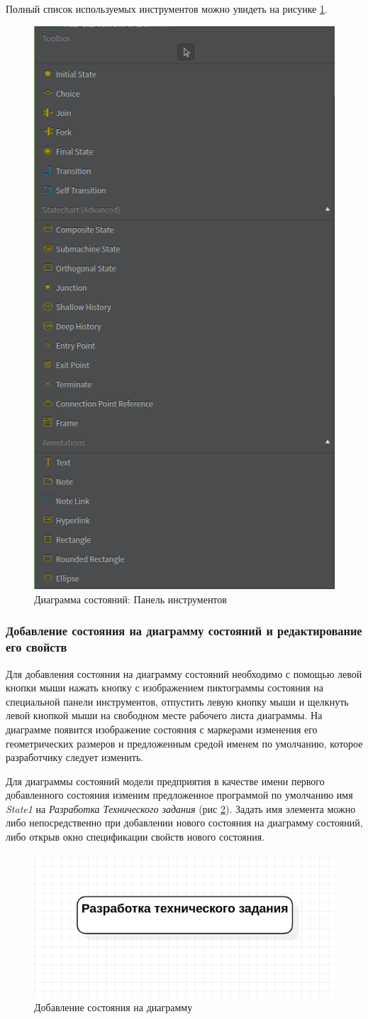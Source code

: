 \documentclass[a4paper,12pt]{report}
\begin{document}
Полный список используемых инструментов можно увидеть на рисунке \ref{fig:statecharttoolbox}.
\newpage
\begin{figure}[h!]
	\centering
	\includegraphics[width=0.4\linewidth]{images/statecharttoolbox}
	\caption{Диаграмма состояний: Панель инструментов}
	\label{fig:statecharttoolbox}
\end{figure}
\subsubsection*{Добавление состояния на диаграмму состояний и редактирование его свойств}
Для добавления состояния на диаграмму состояний необходимо с помощью левой кнопки мыши нажать кнопку с изображением пиктограммы состояния на специальной панели инструментов, отпустить левую кнопку мыши и щелкнуть левой кнопкой мыши на свободном месте рабочего листа диаграммы. На диаграмме появится изображение состояния с маркерами изменения его геометрических размеров и предложенным средой именем по умолчанию, которое разработчику следует изменить.

 Для диаграммы состояний модели предприятия в качестве имени первого добавленного состояния изменим предложенное программой по умолчанию имя \textit{State1} на \textit{Разработка Технического задания} (рис \ref{fig:statechartinit}). Задать имя элемента можно либо непосредственно при добавлении нового состояния на диаграмму состояний, либо открыв окно спецификации свойств нового состояния.

\begin{figure}[h!]
	\centering
	\includegraphics[width=0.7\linewidth]{images/statechartinit}
	\caption{Добавление состояния на диаграмму}
	\label{fig:statechartinit}
\end{figure}
\end{document}
